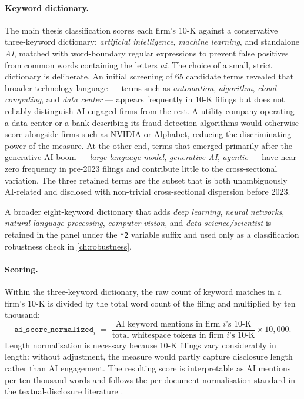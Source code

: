 \paragraph{Keyword dictionary.} The main thesis classification scores each firm's 10-K against a conservative three-keyword dictionary: \emph{artificial intelligence}, \emph{machine learning}, and standalone \emph{AI}, matched with word-boundary regular expressions to prevent false positives from common words containing the letters \emph{ai}. The choice of a small, strict dictionary is deliberate. An initial screening of 65 candidate terms revealed that broader technology language --- terms such as \emph{automation}, \emph{algorithm}, \emph{cloud computing}, and \emph{data center} --- appears frequently in 10-K filings but does not reliably distinguish AI-engaged firms from the rest. A utility company operating a data center or a bank describing its fraud-detection algorithms would otherwise score alongside firms such as NVIDIA or Alphabet, reducing the discriminating power of the measure. At the other end, terms that emerged primarily after the generative-AI boom --- \emph{large language model}, \emph{generative AI}, \emph{agentic} --- have near-zero frequency in pre-2023 filings and contribute little to the cross-sectional variation. The three retained terms are the subset that is both unambiguously AI-related and disclosed with non-trivial cross-sectional dispersion before 2023.

A broader eight-keyword dictionary that adds \emph{deep learning}, \emph{neural networks}, \emph{natural language processing}, \emph{computer vision}, and \emph{data science/scientist} is retained in the panel under the \texttt{*2} variable suffix and used only as a classification robustness check in \cref{ch:robustness}.

\paragraph{Scoring.} Within the three-keyword dictionary, the raw count of keyword matches in a firm's 10-K is divided by the total word count of the filing and multiplied by ten thousand:
\begin{equation}
    \mathtt{ai\_score\_normalized}_i \;=\; \frac{\text{AI keyword mentions in firm }i\text{'s 10-K}}{\text{total whitespace tokens in firm }i\text{'s 10-K}} \times 10{,}000.
    \label{eq:ai-score}
\end{equation}
Length normalisation is necessary because 10-K filings vary considerably in length: without adjustment, the measure would partly capture disclosure length rather than AI engagement. The resulting score is interpretable as AI mentions per ten thousand words and follows the per-document normalisation standard in the textual-disclosure literature \citep{loughranMcDonald2011, hobergPhillips2016}.


